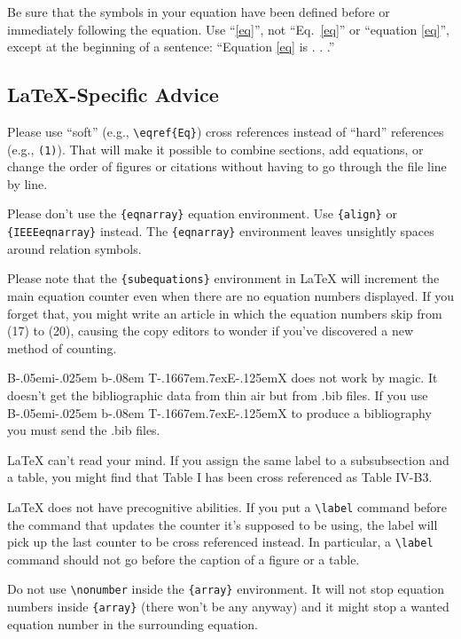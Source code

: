 \documentclass[conference]{IEEEtran}
\def\BibTeX{{\rm B\kern-.05em{\sc i\kern-.025em b}\kern-.08em
    T\kern-.1667em\lower.7ex\hbox{E}\kern-.125emX}}
\begin{document}
Be sure that the 
symbols in your equation have been defined before or immediately following 
the equation. Use ``\eqref{eq}'', not ``Eq.~\eqref{eq}'' or ``equation \eqref{eq}'', except at 
the beginning of a sentence: ``Equation \eqref{eq} is . . .''

\subsection{\LaTeX-Specific Advice}

Please use ``soft'' (e.g., \verb|\eqref{Eq}|) cross references instead
of ``hard'' references (e.g., \verb|(1)|). That will make it possible
to combine sections, add equations, or change the order of figures or
citations without having to go through the file line by line.

Please don't use the \verb|{eqnarray}| equation environment. Use
\verb|{align}| or \verb|{IEEEeqnarray}| instead. The \verb|{eqnarray}|
environment leaves unsightly spaces around relation symbols.

Please note that the \verb|{subequations}| environment in {\LaTeX}
will increment the main equation counter even when there are no
equation numbers displayed. If you forget that, you might write an
article in which the equation numbers skip from (17) to (20), causing
the copy editors to wonder if you've discovered a new method of
counting.

{\BibTeX} does not work by magic. It doesn't get the bibliographic
data from thin air but from .bib files. If you use {\BibTeX} to produce a
bibliography you must send the .bib files. 

{\LaTeX} can't read your mind. If you assign the same label to a
subsubsection and a table, you might find that Table I has been cross
referenced as Table IV-B3. 

{\LaTeX} does not have precognitive abilities. If you put a
\verb|\label| command before the command that updates the counter it's
supposed to be using, the label will pick up the last counter to be
cross referenced instead. In particular, a \verb|\label| command
should not go before the caption of a figure or a table.

Do not use \verb|\nonumber| inside the \verb|{array}| environment. It
will not stop equation numbers inside \verb|{array}| (there won't be
any anyway) and it might stop a wanted equation number in the
surrounding equation.
\end{document}
